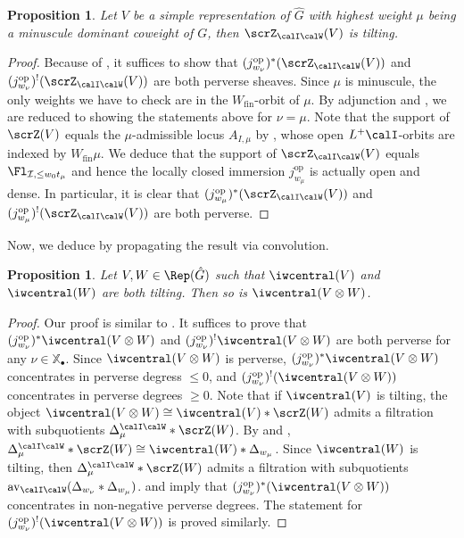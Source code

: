 \documentclass[10pt, reqno]{amsart}
\theoremstyle{plain}
\newtheorem{proposition}[theorem]{Proposition}
\theoremstyle{definition}
\numberwithin{equation}{section}
\begin{document}
\begin{proposition}\label{Z_IW_is_tilting_for_minuscule_coweights}
	Let $V$ be a simple representation of $\hat{G}$ with highest weight $\mu$ being a minuscule dominant coweight of $G$, then $\scrZ_{\calI\calW}(V)$ is tilting.
\end{proposition}
\begin{proof}
	Because of , it suffices to show that $(j_{w_\nu}^{\mathrm{op}})^*(\scrZ_{\calI\calW}(V))$ and $(j_{w_\nu}^{\mathrm{op}})^!(\scrZ_{\calI\calW}(V))$ are both perverse sheaves. Since $\mu$ is minuscule, the only weights we have to check are in the $W_{\mathrm{fin}}$-orbit of $\mu$. By adjunction and , we are reduced to showing the statements above for $\nu=\mu$. Note that the support of $\scrZ(V)$ equals the $\mu$-admissible locus $A_{I,\mu}$ by \cite[Theorem 6.16]{AGLR22}, whose open $L^+\calI$-orbits are indexed by $W_{\mathrm{fin}}\mu$. We deduce that the support of $\scrZ_{\calI\calW}(V)$ equals $\Fl_{\mathcal{I},\leq w_0t_\mu}$ and hence the locally closed immersion $j_{w_\mu}^{\mathrm{op}}$ is actually open and dense. In particular, it is clear that $(j_{w_\mu}^{\mathrm{op}})^*(\scrZ_{\calI\calW}(V))$ and $(j_{w_\mu}^{\mathrm{op}})^!(\scrZ_{\calI\calW}(V))$ are both perverse.
\end{proof}


Now, we deduce  by propagating the result via convolution.

\begin{proposition}\label{lem_prop_tilting_tensor_prod}
	Let $V,W\in\Rep(\hat{G})$ such that $\iwcentral (V)$ and $\iwcentral (W)$ are both tilting. Then so is $\iwcentral (V\otimes W)$.
\end{proposition}
\begin{proof}
	Our proof is similar to \cite[Proposition 6.5.7]{AR}. It suffices to prove that $(j_{w_\nu}^{\mathrm{op}})^*\iwcentral (V\otimes W)$ and $(j_{w_\nu}^{\mathrm{op}})^!\iwcentral (V\otimes W)$ are both perverse for any $\nu\in\mathbb{X}_\bullet$. Since $\iwcentral (V\otimes W)$ is perverse, $(j_{w_\nu}^{\mathrm{op}})^*\iwcentral (V\otimes W)$ concentrates in perverse degress $\leq 0$, and $(j_{w_\nu}^{\mathrm{op}})^!(\iwcentral (V\otimes W))$ concentrates in perverse degrees $\geq 0$. Note that if $\iwcentral(V)$ is tilting, the object $\iwcentral(V\otimes W)\cong \iwcentral(V)*\scrZ(W)$ admits a filtration with subquotients $\Delta_\mu^{\calI\calW}*\scrZ(W)$. By  and , $\Delta_\mu^{{\calI\calW}}*\scrZ(W)\cong \iwcentral(W)*\Delta_{w_\mu}$. Since $\iwcentral(W)$ is tilting, then $\Delta_\mu^{{\calI\calW}}*\scrZ(W)$ admits a filtration with subquotients $\mathrm{av}_{{\calI\calW}}(\Delta_{w_\nu}*\Delta_{w_\mu})$.  and  imply that $(j_{w_\nu}^{\mathrm{op}})^*(\iwcentral(V\otimes W))$ concentrates in non-negative perverse degrees. The statement for $(j_{w_\nu}^{\mathrm{op}})^!(\iwcentral(V\otimes W))$ is proved similarly.
\end{proof}
\end{document}
